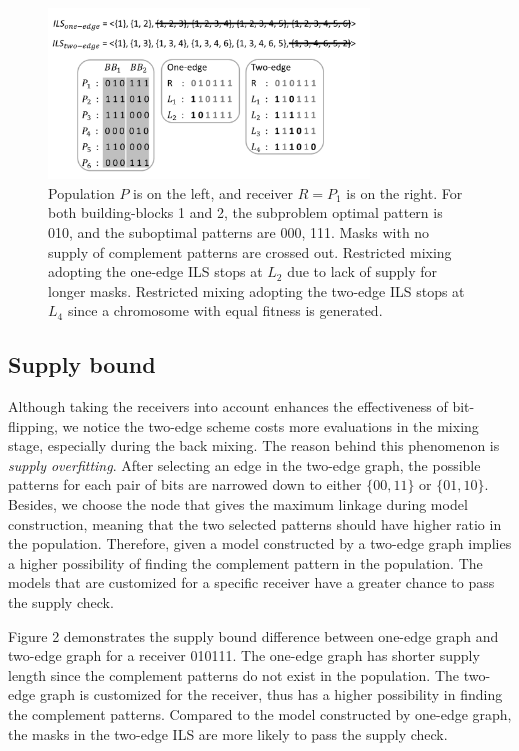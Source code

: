 \begin{figure}
\centering
\includegraphics[width=3.35in]{SupplyBound}
\caption{Population $ P $ is on the left, and receiver $ R  = P_{1} $ is on the right. For both building-blocks 1 and 2, the subproblem optimal pattern is 010, and the suboptimal patterns are 000, 111. Masks with no supply of complement patterns are crossed out. Restricted mixing adopting the one-edge ILS stops at $ L_{2}$ due to lack of supply for longer masks. Restricted mixing adopting the two-edge ILS stops at $ L_{4} $ since a chromosome with equal fitness is generated.}
\end{figure}




\subsection{Supply bound}
Although taking the receivers into account enhances the effectiveness of bit-flipping, we notice the two-edge scheme costs more evaluations in the mixing stage, especially during the back mixing. The reason behind this phenomenon is \textit{supply overfitting}. After selecting an edge in the two-edge graph, the possible patterns for each pair of bits are narrowed down to either $\{00, 11\}$ or $\{01, 10\}$. Besides, we choose the node that gives the maximum linkage during model construction, meaning that the two selected patterns should have higher ratio in the population. Therefore, given a model constructed by a two-edge graph implies a higher possibility of finding the complement pattern in the population. The models that are customized for a specific receiver have a greater chance to pass the supply check. 


Figure 2 demonstrates the supply bound difference between one-edge graph and two-edge graph for a receiver 010111. The one-edge graph has shorter supply length since the complement patterns do not exist in the population. The two-edge graph is customized for the receiver, thus has a higher possibility in finding the complement patterns. Compared to the model constructed by one-edge graph, the masks in the two-edge ILS are more likely to pass the supply check. 


